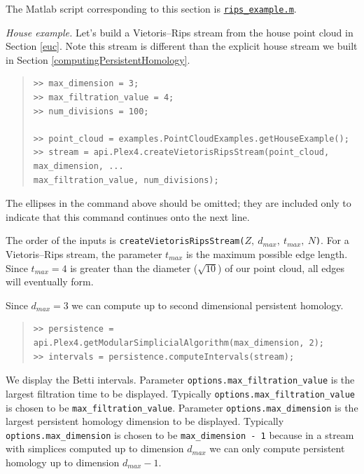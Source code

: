 \documentclass[amscd, amssymb, verbatim]{amsart}[12pt]
\theoremstyle{remark}
\theoremstyle{remark}
\theoremstyle{remark}
\begin{document}
The Matlab script corresponding to this section is \href{https://github.com/appliedtopology/javaplex/tree/master/src/matlab/for_distribution/tutorial_examples/rips_example.m}{\texttt{rips\_example.m}}. 

{\em House example.} Let's build a Vietoris--Rips stream from the house point cloud in Section \ref{euc}. Note this stream is different than the explicit house stream we built in Section \ref{computingPersistentHomology}.

\begin{quote} \begin{verbatim}
>> max_dimension = 3;
>> max_filtration_value = 4;
>> num_divisions = 100;

>> point_cloud = examples.PointCloudExamples.getHouseExample();
>> stream = api.Plex4.createVietorisRipsStream(point_cloud, max_dimension, ...
max_filtration_value, num_divisions);
\end{verbatim} \end{quote}

The ellipses in the command above should be omitted; they are included only to indicate that this command continues onto the next line. 

The order of the inputs is \texttt{createVietorisRipsStream(}$Z,\ d_{max},\ t_{max},\ N$\texttt{)}. For a Vietoris--Rips stream, the parameter $t_{max}$ is the maximum possible edge length. Since $t_{max} = 4$ is greater than the diameter ($\sqrt{10}$) of our point cloud, all edges will eventually form. 

Since $d_{max} = 3$ we can compute up to second dimensional persistent homology.

\begin{quote} \begin{verbatim}
>> persistence = api.Plex4.getModularSimplicialAlgorithm(max_dimension, 2);
>> intervals = persistence.computeIntervals(stream);
\end{verbatim} \end{quote}

We display the Betti intervals. Parameter \texttt{options.max\_filtration\_value} is the largest filtration time to be displayed. Typically \texttt{options.max\_filtration\_value} is chosen to be \texttt{max\_filtration\_value}. Parameter \texttt{options.max\_dimension} is the largest persistent homology dimension to be displayed. Typically \texttt{options.max\_dimension} is chosen to be \texttt{max\_dimension - 1} because in a stream with simplices computed up to dimension $d_{max}$ we can only compute persistent homology up to dimension $d_{max} - 1$.
\end{document}

